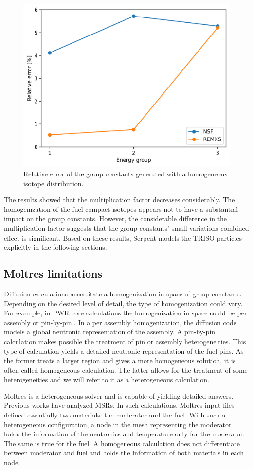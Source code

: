 \documentclass[11pt,letterpaper]{article}
\begin{document}
\begin{figure}[htbp!]
	\centering
	\includegraphics[width=0.45\linewidth]{figures/param-comparison}
	\hfill
	\caption{Relative error of the group constants generated with a homogeneous isotope distribution.}
	\label{fig:param-comparison}
\end{figure}

The results showed that the multiplication factor decreases considerably.
The homogenization of the fuel compact isotopes appears not to have a substantial impact on the group constants.
However, the considerable difference in the multiplication factor suggests that the group constants' small variations combined effect is significant.
Based on these results, Serpent models the TRISO particles explicitly in the following sections.

\subsection{Moltres limitations}

Diffusion calculations necessitate a homogenization in space of group constants.
Depending on the desired level of detail, the type of homogenization could vary.
For example, in PWR core calculations the homogenization in space could be per assembly or pin-by-pin \cite{krebs_calculational_1990}.
In a per assembly homogenization, the diffusion code models a global neutronic representation of the assembly.
A pin-by-pin calculation makes possible the treatment of pin or assembly heterogeneities.
This type of calculation yields a detailed neutronic representation of the fuel pins.
As the former treats a larger region and gives a more homogeneous solution, it is often called homogeneous calculation.
The latter allows for the treatment of some heterogeneities and we will refer to it as a heterogeneous calculation.

Moltres is a heterogeneous solver and is capable of yielding detailed answers.
Previous works \cite{lindsay_introduction_2018}\cite{pater_multiphysics_2019} have analyzed \glspl{MSR}.
In such calculations, Moltres input files defined essentially two materials: the moderator and the fuel.
With such a heterogeneous configuration, a node in the mesh representing the moderator holds the information of the neutronics and temperature only for the moderator.
The same is true for the fuel.
A homogeneous calculation does not differentiate between moderator and fuel and holds the information of both materials in each node.
\end{document}
